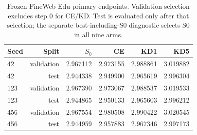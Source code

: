 \begin{table}[!t]\centering
\begin{tabular}{lrrrrr}
\toprule
Seed & Split & $S_0$ & CE & KD1 & KD5 \\
\midrule
42 & validation & 2.967112 & 2.973155 & 2.988861 & 3.019882 \\
42 & test & 2.944338 & 2.949900 & 2.965619 & 2.996304 \\
123 & validation & 2.967390 & 2.973067 & 2.988537 & 3.019533 \\
123 & test & 2.944865 & 2.950133 & 2.965603 & 2.996212 \\
456 & validation & 2.967554 & 2.980508 & 2.990422 & 3.020545 \\
456 & test & 2.944959 & 2.957883 & 2.967346 & 2.997173 \\
\bottomrule
\end{tabular}
\caption{Frozen FineWeb-Edu primary endpoints. Validation selection excludes step 0 for CE/KD. Test is evaluated only after that selection; the separate best-including-S0 diagnostic selects S0 in all nine arms.}\label{tab:modern_endpoints}
\end{table}
